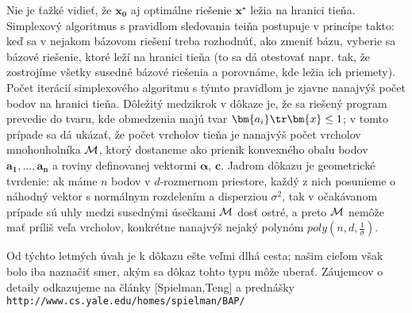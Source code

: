 \noindent
Nie je ťažké vidieť, že $\bm{x_0}$ aj optimálne riešenie $\bm{x^\star}$ ležia na hranici tieňa. 
Simplexový algoritmus s pravidlom sledovania teiňa postupuje v princípe takto: 
keď sa v nejakom bázovom riešení treba rozhodnúť, ako zmeniť bázu, 
vyberie sa bázové riešenie, ktoré leží na hranici tieňa
(to sa dá otestovať napr. tak, že zostrojíme všetky susedné bázové riešenia a porovnáme, kde ležia ich priemety).
Počet iterácií simplexového algoritmu s týmto pravidlom je zjavne nanajvýš počet bodov na hranici tieňa. 
Dôležitý medzikrok v dôkaze je, že sa riešený program prevedie do tvaru, kde 
obmedzenia majú tvar $\bm{a_i}\tr\bm{x}\le1$; v tomto
prípade sa dá ukázať, že počet vrcholov tieňa je nanajvýš počet vrcholov mnohouholníka $\cal M$,
ktorý dostaneme ako prienik konvexného obalu bodov 
$\bm{a_1},\ldots,\bm{a_n}$ a roviny definovanej vektormi $\bm{\alpha}$, $\bm{c}$.
Jadrom dôkazu je geometrické tvrdenie: ak máme $n$ bodov v $d$-rozmernom priestore, každý z nich posunieme
o náhodný vektor s normálnym rozdelením a disperziou $\sigma^2$, tak v očakávanom prípade sú uhly medzi susednými
úsečkami $\cal M$ dosť ostré, a preto $\cal M$ nemôže mať príliš veľa vrcholov, konkrétne nanajvýš nejaký polynóm
$poly(n,d,\frac{1}{\sigma})$.

\noindent
Od týchto letmých úvah je k dôkazu ešte veľmi dlhá cesta; našim cieľom však bolo iba naznačiť smer, akým sa
dôkaz tohto typu môže uberať. Záujemcov o detaily odkazujeme na články [Spielman,Teng] a prednášky
{\tt http://www.cs.yale.edu/homes/spielman/BAP/}
